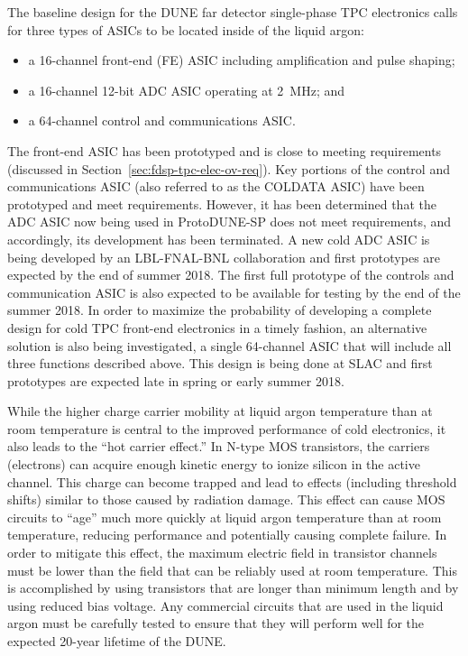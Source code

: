 The baseline design for the DUNE far detector single-phase TPC electronics calls for three types of ASICs to be located inside of the liquid argon:
\begin{itemize}
\item{a 16-channel front-end (FE) ASIC including amplification and pulse shaping;}
\item{a 16-channel 12-bit ADC ASIC operating at 2~MHz; and}
\item{a 64-channel control and communications ASIC.}
\end{itemize}
The front-end ASIC has been prototyped and is close to meeting requirements (discussed in Section~\ref{sec:fdsp-tpc-elec-ov-req}).  Key portions of the control and communications ASIC (also referred to as the COLDATA ASIC) have been prototyped and meet requirements.  However, it has been determined that the ADC ASIC now being used in ProtoDUNE-SP does not meet requirements, and accordingly, its development has been terminated.  A new cold ADC ASIC is being developed by an LBL-FNAL-BNL collaboration and first prototypes are expected by the end of summer 2018.  The first full prototype of the controls and communication ASIC is also expected to be available for testing by the end of the summer 2018.  In order to maximize the probability of developing a complete design for cold TPC front-end electronics in a timely fashion, an alternative solution is also being investigated, a single 64-channel ASIC that will include all three functions described above.  This design is being done at SLAC and first prototypes are expected late in spring or early summer 2018.

While the higher charge carrier mobility at liquid argon temperature than at room temperature is central to the improved performance of cold electronics, it also leads to the ``hot carrier effect.''  In N-type MOS transistors, the carriers (electrons) can acquire enough kinetic energy to ionize silicon in the active channel.  This charge can become trapped and lead to effects (including threshold shifts) similar to those caused by radiation damage.  This effect can cause MOS circuits to ``age'' much more quickly at liquid argon temperature than at room temperature, reducing performance and potentially causing complete failure.  In order to mitigate this effect, the maximum electric field in transistor channels must be lower than the field that can be reliably used at room temperature.  This is accomplished by using transistors that are longer than minimum length and by using reduced bias voltage.  Any commercial circuits that are used in the liquid argon must be carefully tested to ensure that they will perform well for the expected 20-year lifetime of the DUNE.

